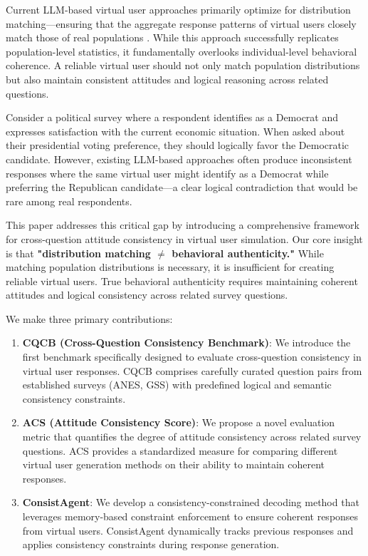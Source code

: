 \documentclass{article}
\begin{document}
Current LLM-based virtual user approaches primarily optimize for distribution matching—ensuring that the aggregate response patterns of virtual users closely match those of real populations \cite{zhang2025llm, liu2025alignsurvey}. While this approach successfully replicates population-level statistics, it fundamentally overlooks individual-level behavioral coherence. A reliable virtual user should not only match population distributions but also maintain consistent attitudes and logical reasoning across related questions.

Consider a political survey where a respondent identifies as a Democrat and expresses satisfaction with the current economic situation. When asked about their presidential voting preference, they should logically favor the Democratic candidate. However, existing LLM-based approaches often produce inconsistent responses where the same virtual user might identify as a Democrat while preferring the Republican candidate—a clear logical contradiction that would be rare among real respondents.

This paper addresses this critical gap by introducing a comprehensive framework for cross-question attitude consistency in virtual user simulation. Our core insight is that \textbf{"distribution matching $\neq$ behavioral authenticity."} While matching population distributions is necessary, it is insufficient for creating reliable virtual users. True behavioral authenticity requires maintaining coherent attitudes and logical consistency across related survey questions.

We make three primary contributions:

\begin{enumerate}
    \item \textbf{CQCB (Cross-Question Consistency Benchmark)}: We introduce the first benchmark specifically designed to evaluate cross-question consistency in virtual user responses. CQCB comprises carefully curated question pairs from established surveys (ANES, GSS) with predefined logical and semantic consistency constraints.
    
    \item \textbf{ACS (Attitude Consistency Score)}: We propose a novel evaluation metric that quantifies the degree of attitude consistency across related survey questions. ACS provides a standardized measure for comparing different virtual user generation methods on their ability to maintain coherent responses.
    
    \item \textbf{ConsistAgent}: We develop a consistency-constrained decoding method that leverages memory-based constraint enforcement to ensure coherent responses from virtual users. ConsistAgent dynamically tracks previous responses and applies consistency constraints during response generation.
\end{enumerate}
\end{document}
